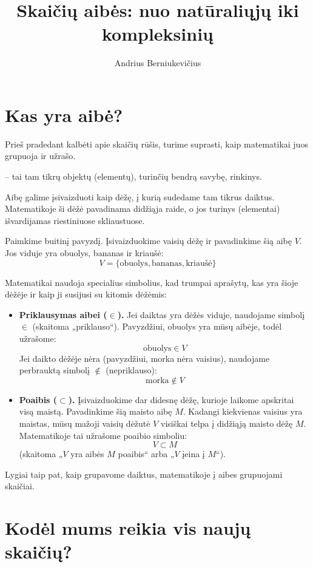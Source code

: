 \documentclass[11pt,a4paper]{scrartcl}
\title{Skaičių aibės: nuo natūraliųjų iki kompleksinių}
\author{Andrius Berniukevičius}
\begin{document}
\maketitle

\section{Kas yra aibė?}

Prieš pradedant kalbėti apie skaičių rūšis, turime suprasti, kaip matematikai juos grupuoja ir užrašo.

\begin{definition}
 -- tai tam tikrų objektų (elementų), turinčių bendrą savybę, rinkinys. 
\end{definition}

Aibę galime įsivaizduoti kaip dėžę, į kurią sudedame tam tikrus daiktus. Matematikoje ši dėžė pavadinama didžiąja raide, o jos turinys (elementai) išvardijamas riestiniuose skliaustuose. 

Paimkime buitinį pavyzdį. Įsivaizduokime vaisių dėžę ir pavadinkime šią aibę $V$. Jos viduje yra obuolys, bananas ir kriaušė:
\[ V = \{ \text{obuolys}, \text{bananas}, \text{kriaušė} \} \]

Matematikai naudoja specialius simbolius, kad trumpai aprašytų, kas yra šioje dėžėje ir kaip ji susijusi su kitomis dėžėmis:
\begin{itemize}
    \item \textbf{Priklausymas aibei ($\in$).} Jei daiktas yra dėžės viduje, naudojame simbolį $\in$ (skaitoma „priklauso“). Pavyzdžiui, obuolys yra mūsų aibėje, todėl užrašome:
    \[ \text{obuolys} \in V \]
    Jei daikto dėžėje nėra (pavyzdžiui, morka nėra vaisius), naudojame perbrauktą simbolį $\notin$ (nepriklauso):
    \[ \text{morka} \notin V \]
    
    \item \textbf{Poaibis ($\subset$).} Įsivaizduokime dar didesnę dėžę, kurioje laikome apskritai visą maistą. Pavadinkime šią maisto aibę $M$. Kadangi kiekvienas vaisius yra maistas, mūsų mažoji vaisių dėžutė $V$ visiškai telpa į didžiąją maisto dėžę $M$. Matematikoje tai užrašome poaibio simboliu:
    \[ V \subset M \]
    (skaitoma „$V$ yra aibės $M$ poaibis“ arba „$V$ įeina į $M$“).
\end{itemize}

Lygiai taip pat, kaip grupavome daiktus, matematikoje į aibes grupuojami skaičiai.

\section{Kodėl mums reikia vis naujų skaičių?}
\end{document}

